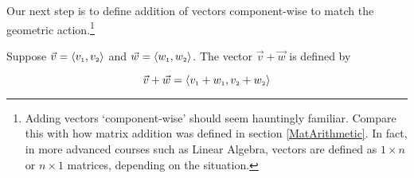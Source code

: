Our next step is to define addition of vectors component-wise to match the geometric action.\footnote{Adding vectors `component-wise' should seem hauntingly familiar.  Compare this with how matrix addition was defined in section \ref{MatArithmetic}. In fact, in more advanced courses such as Linear Algebra, vectors are defined as $1\times n$ or $n \times 1$ matrices, depending on the situation.}

\smallskip

\colorbox{ResultColor}{\bbm
\begin{defn} \label{vectoradd}  Suppose $\vec{v} = \left<v_{\mbox{\tiny $1$}},v_{\mbox{\tiny $2$}}\right>$ and $\vec{w} = \left<w_{\mbox{\tiny $1$}},w_{\mbox{\tiny $2$}}\right>$.  The vector $\vec{v} + \vec{w}$ is defined by 

\[ \vec{v} + \vec{w}  = \left< v_{\mbox{\tiny $1$}} + w_{\mbox{\tiny $1$}}, v_{\mbox{\tiny $2$}} + w_{\mbox{\tiny $2$}} \right> \]


\end{defn}
\ebm}

